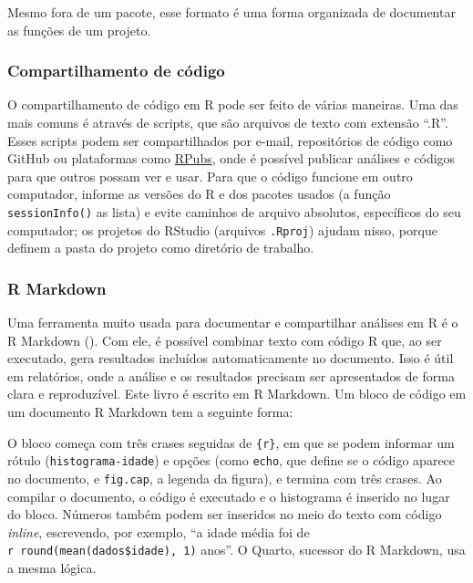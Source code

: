 \documentclass[
]{book}
\newenvironment{Shaded}{\begin{snugshade}}{\end{snugshade}}
\newcommand{\InformationTok}[1]{\textcolor[rgb]{0.56,0.35,0.01}{\textbf{\textit{#1}}}}
\begin{document}
Mesmo fora de um pacote, esse formato é uma forma organizada de documentar as funções de um projeto.

\subsubsection{Compartilhamento de código}\label{compartilhamento-de-cuxf3digo}

O compartilhamento de código em R pode ser feito de várias maneiras. Uma das mais comuns é através de scripts, que são arquivos de texto com extensão ``.R''. Esses scripts podem ser compartilhados por e-mail, repositórios de código como GitHub ou plataformas como \href{https://rpubs.com}{RPubs}, onde é possível publicar análises e códigos para que outros possam ver e usar. Para que o código funcione em outro computador, informe as versões do R e dos pacotes usados (a função \texttt{sessionInfo()} as lista) e evite caminhos de arquivo absolutos, específicos do seu computador; os projetos do RStudio (arquivos \texttt{.Rproj}) ajudam nisso, porque definem a pasta do projeto como diretório de trabalho.

\subsubsection{R Markdown}\label{r-markdown}

Uma ferramenta muito usada para documentar e compartilhar análises em R é o R Markdown (). Com ele, é possível combinar texto com código R que, ao ser executado, gera resultados incluídos automaticamente no documento. Isso é útil em relatórios, onde a análise e os resultados precisam ser apresentados de forma clara e reproduzível. Este livro é escrito em R Markdown. Um bloco de código em um documento R Markdown tem a seguinte forma:

\begin{Shaded}
\end{Shaded}

O bloco começa com três crases seguidas de \texttt{\{r\}}, em que se podem informar um rótulo (\texttt{histograma-idade}) e opções (como \texttt{echo}, que define se o código aparece no documento, e \texttt{fig.cap}, a legenda da figura), e termina com três crases. Ao compilar o documento, o código é executado e o histograma é inserido no lugar do bloco. Números também podem ser inseridos no meio do texto com código \emph{inline}, escrevendo, por exemplo, ``a idade média foi de \texttt{\textasciigrave{}r\ round(mean(dados\$idade),\ 1)\textasciigrave{}} anos''. O Quarto, sucessor do R Markdown, usa a mesma lógica.
\end{document}
